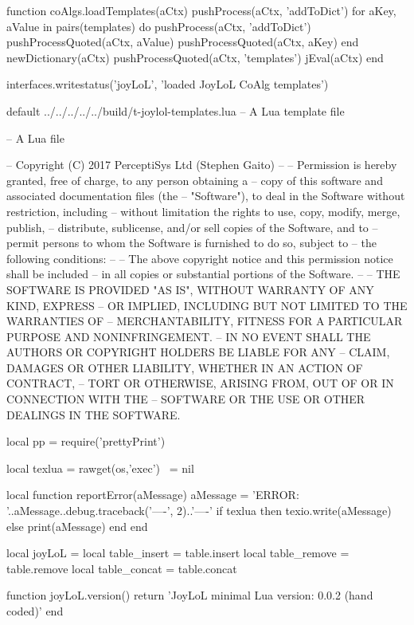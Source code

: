 function coAlgs.loadTemplates(aCtx)
  pushProcess(aCtx, 'addToDict')
  for aKey, aValue in pairs(templates) do
    pushProcess(aCtx, 'addToDict')
    pushProcessQuoted(aCtx, aValue)
    pushProcessQuoted(aCtx, aKey)
  end
  newDictionary(aCtx)
  pushProcessQuoted(aCtx, 'templates')
  jEval(aCtx)
end

interfaces.writestatus('joyLoL', 'loaded JoyLoL CoAlg templates')
\stopLuaTemplate

\createLuaTemplateFile%
  {default}%
  {../../../../../build/t-joylol-templates.lua}%
  {-- A Lua template file}

\startMinJoyLoL
-- A Lua file

-- Copyright (C) 2017 PerceptiSys Ltd (Stephen Gaito)
--
-- Permission is hereby granted, free of charge, to any person obtaining a 
-- copy of this software and associated documentation files (the 
-- "Software"), to deal in the Software without restriction, including 
-- without limitation the rights to use, copy, modify, merge, publish, 
-- distribute, sublicense, and/or sell copies of the Software, and to 
-- permit persons to whom the Software is furnished to do so, subject to 
-- the following conditions:
--
-- The above copyright notice and this permission notice shall be included 
-- in all copies or substantial portions of the Software.
--
-- THE SOFTWARE IS PROVIDED "AS IS", WITHOUT WARRANTY OF ANY KIND, EXPRESS 
-- OR IMPLIED, INCLUDING BUT NOT LIMITED TO THE WARRANTIES OF 
-- MERCHANTABILITY, FITNESS FOR A PARTICULAR PURPOSE AND NONINFRINGEMENT. 
-- IN NO EVENT SHALL THE AUTHORS OR COPYRIGHT HOLDERS BE LIABLE FOR ANY 
-- CLAIM, DAMAGES OR OTHER LIABILITY, WHETHER IN AN ACTION OF CONTRACT, 
-- TORT OR OTHERWISE, ARISING FROM, OUT OF OR IN CONNECTION WITH THE 
-- SOFTWARE OR THE USE OR OTHER DEALINGS IN THE SOFTWARE.

local pp = require('prettyPrint')

local texlua = rawget(os,'exec')    ~= nil

local function reportError(aMessage)
  aMessage = 'ERROR: '..aMessage..debug.traceback('\n----', 2)..'\n----\n'
  if texlua then
    texio.write(aMessage)
  else
    print(aMessage)
  end
end

local joyLoL = { }
local table_insert = table.insert
local table_remove = table.remove
local table_concat = table.concat

function joyLoL.version()
  return 'JoyLoL minimal Lua version: 0.0.2 (hand coded)'
end

